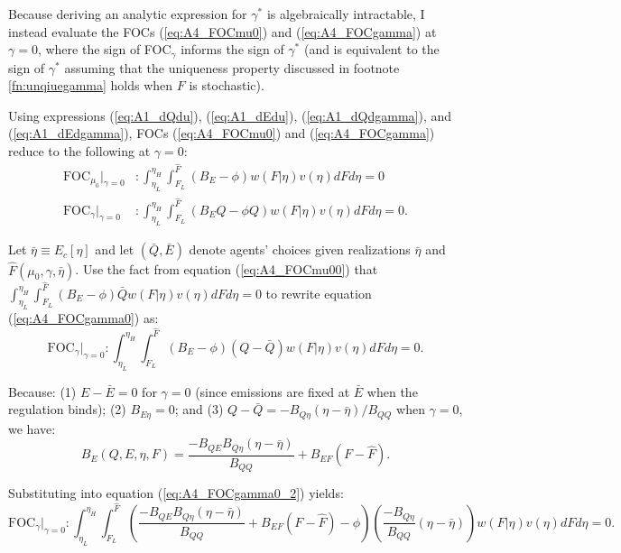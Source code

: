 \documentclass[12pt]{article}
\begin{document}
Because deriving an analytic expression for $\gamma^*$ is algebraically intractable, I instead evaluate the FOCs (\ref{eq:A4_FOCmu0}) and (\ref{eq:A4_FOCgamma}) at $\gamma=0$, where the sign of FOC$_\gamma$ informs the sign of $\gamma^*$ (and is equivalent to the sign of $\gamma^*$ assuming that the uniqueness property discussed in footnote \ref{fn:unqiuegamma} holds when $F$ is stochastic).

Using expressions (\ref{eq:A1_dQdu}), (\ref{eq:A1_dEdu}), (\ref{eq:A1_dQdgamma}), and (\ref{eq:A1_dEdgamma}), FOCs (\ref{eq:A4_FOCmu0}) and (\ref{eq:A4_FOCgamma}) reduce to the following at $\gamma=0$:
\begin{align}
\text{FOC}_{\mu_0}|_{\gamma=0}&:\int_{\eta_L}^{\eta_H}\int_{F_L}^{\hat{F}}(B_E-\phi)w(F|\eta)v(\eta)dFd\eta = 0 \label{eq:A4_FOCmu00} \\
\text{FOC}_{\gamma}|_{\gamma=0}&:\int_{\eta_L}^{\eta_H}\int_{F_L}^{\hat{F}}(B_EQ-\phi Q)w(F|\eta)v(\eta)dFd\eta = 0. \label{eq:A4_FOCgamma0}
\end{align}

Let $\bar{\eta}\equiv E_c[\eta]$ and let $(\bar{Q},\bar{E})$ denote agents' choices given realizations $\bar{\eta}$ and $\hat{F}(\mu_0,\gamma,\bar{\eta})$. Use the fact from equation (\ref{eq:A4_FOCmu00}) that $\int_{\eta_L}^{\eta_H}\int_{F_L}^{\hat{F}}(B_E-\phi)\bar{Q}w(F|\eta)v(\eta)dFd\eta = 0$ to rewrite equation (\ref{eq:A4_FOCgamma0}) as:
\begin{equation}
\text{FOC}_{\gamma}|_{\gamma=0}:\int_{\eta_L}^{\eta_H}\int_{F_L}^{\hat{F}}(B_E-\phi)(Q-\bar{Q})w(F|\eta)v(\eta)dFd\eta = 0. \label{eq:A4_FOCgamma0_2}
\end{equation}

Because: (1) $E-\bar{E}=0$ for $\gamma=0$ (since emissions are fixed at $\bar{E}$ when the regulation binds); (2) $B_{E\eta}=0$; and (3) $Q-\bar{Q}=-B_{Q\eta}(\eta-\bar{\eta})/B_{QQ}$ when $\gamma=0$, we have:
\begin{equation}
B_E(Q,E,\eta,F)=\frac{-B_{QE}B_{Q\eta}(\eta-\bar{\eta})}{B_{QQ}}+B_{EF}(F-\hat{F}).
\end{equation} 

Substituting into equation (\ref{eq:A4_FOCgamma0_2}) yields:
\begin{equation}
\text{FOC}_{\gamma}|_{\gamma=0}:\int_{\eta_L}^{\eta_H}\int_{F_L}^{\hat{F}}\left(\frac{-B_{QE}B_{Q\eta}(\eta-\bar{\eta})}{B_{QQ}}+B_{EF}(F-\hat{F})-\phi\right)\left(\frac{-B_{Q\eta}}{B_{QQ}}(\eta-\bar{\eta})\right)w(F|\eta)v(\eta)dFd\eta = 0. \label{eq:A4_FOCgamma0_3}
\end{equation}
\end{document}
